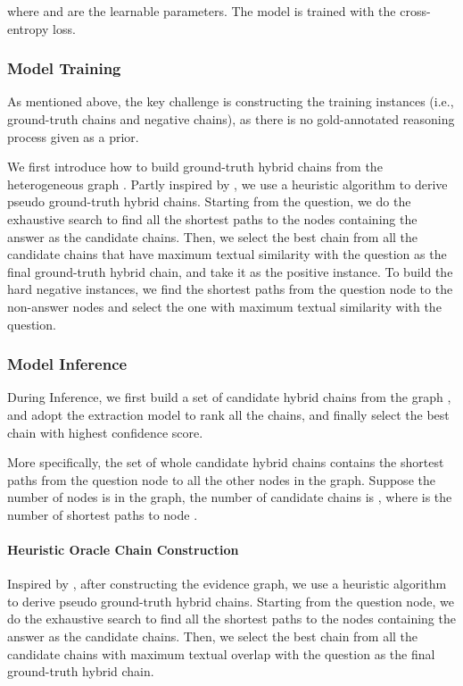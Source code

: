 \documentclass[11pt]{article}
\begin{document}
	where  and  are the learnable parameters.
The model is trained with the cross-entropy loss.
	\subsubsection{Model Training}
	As mentioned above, the key challenge is constructing the training instances (i.e., ground-truth chains and negative chains), as there is no gold-annotated reasoning process given as a prior. 
	
	We first introduce how to build ground-truth hybrid chains from the heterogeneous graph  . 
	Partly inspired by \citet{chen2019multi}, we use a heuristic algorithm to derive pseudo ground-truth hybrid chains. 
	Starting from the question, we do the exhaustive search to find all the shortest paths to the nodes containing the answer as the candidate chains. 
	Then, we select the best chain from all the candidate chains that have maximum textual similarity with the question as the final ground-truth hybrid chain, and take it as the positive instance.
To build the hard negative instances, we find the shortest paths from the question node to the non-answer nodes and select the one with maximum textual similarity with the question.
	\subsubsection{Model Inference}
	During Inference, we first build a set of candidate hybrid chains from the graph , and adopt the extraction model to rank all the chains, and finally select the best chain with highest confidence score.
	
	More specifically, the set of whole candidate hybrid chains contains the shortest paths from the question node to all the other nodes in the graph. 
	Suppose the number of nodes is  in the graph, the number of candidate chains is , where  is the number of shortest paths to node .
	
	\iffalse
	\paragraph{Heuristic Oracle Chain Construction}
	
	
	Inspired by \citet{chen2019multi}, after constructing the evidence graph, we use a heuristic algorithm to derive pseudo ground-truth hybrid chains. Starting from the question node, we do the exhaustive search to find all the shortest paths to the nodes containing the answer as the candidate chains. 
	Then, we select the best chain from all the candidate chains with maximum textual overlap with the question as the final ground-truth hybrid chain.
	
\end{document}
